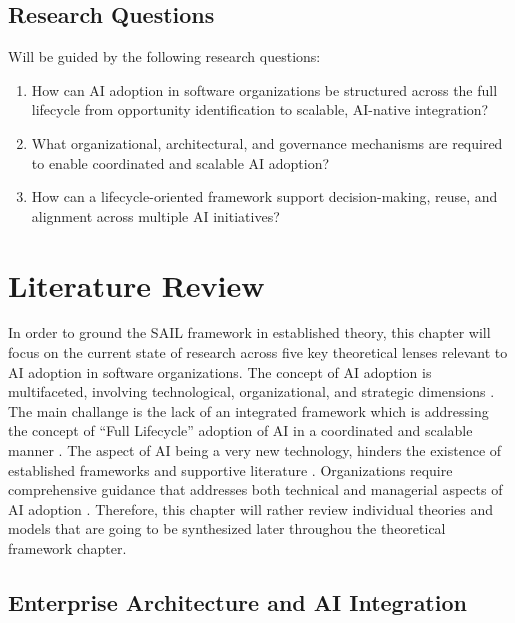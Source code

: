 \documentclass[]{imc-inf}
\begin{document}
	\section{Research Questions}
	Will be guided by the following research questions:

	\begin{enumerate}[label=\textbf{RQ\arabic*:}, leftmargin=1.5cm]
    \item \label{rq:lifecycle} How can AI adoption in software organizations be structured across the full lifecycle from opportunity identification to scalable, AI-native integration?
    
    \item \label{rq:mechanisms} What organizational, architectural, and governance mechanisms are required to enable coordinated and scalable AI adoption?
    
    \item \label{rq:framework} How can a lifecycle-oriented framework support decision-making, reuse, and alignment across multiple AI initiatives?
\end{enumerate}


\chapter{Literature Review}\label{literature-review}

In order to ground the SAIL framework in established theory, this
chapter will focus on the current state of research across five key
theoretical lenses relevant to AI adoption in software organizations.
The concept of AI adoption is multifaceted, involving technological,
organizational, and strategic dimensions \citep{Dwivedi2021}. The main challange is the lack
of an integrated framework which is addressing the concept of ``Full
Lifecycle'' adoption of AI in a coordinated and scalable manner \citep{Nogare2025}. The
aspect of AI being a very new technology, hinders the existence of
established frameworks and supportive literature \citep{Benbya2021}. Organizations require comprehensive guidance that addresses both technical and managerial aspects of AI adoption \citep{Berente2021}. Therefore, this
chapter will rather review individual theories and models that are going
to be synthesized later throughou the theoretical framework chapter.

\section{Enterprise Architecture and AI Integration}
\end{document}
